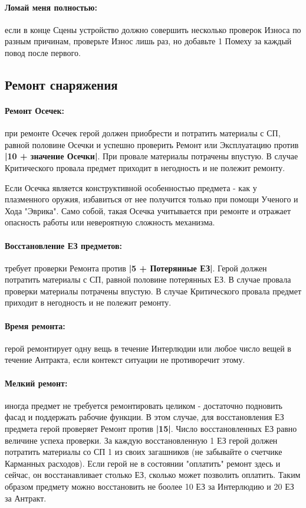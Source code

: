 \paragraph{Ломай меня полностью:} если в конце Сцены устройство должно совершить несколько проверок Износа по разным причинам, проверьте Износ лишь раз, но добавьте 1 Помеху за каждый повод после первого. 

\subsection{Ремонт снаряжения}
\paragraph{Ремонт Осечек:} при ремонте Осечек герой должен приобрести и потратить материалы с СП, равной половине Осечки и успешно проверить Ремонт или Эксплуатацию против \textbf{|10 + значение Осечки|}. При провале материалы потрачены впустую. В случае Критического провала предмет приходит в негодность и  не полежит ремонту. 
\begin{tcolorbox}
    Если Осечка является конструктивной особенностью предмета - как у плазменного оружия, избавиться от нее получится только при помощи Ученого и Хода "Эврика". Само собой, такая Осечка учитывается при ремонте и отражает опасность работы или невероятную сложность механизма.
\end{tcolorbox}

\paragraph{Восстановление ЕЗ предметов:} требует проверки Ремонта против \textbf{|5 + Потерянные ЕЗ|}. Герой должен потратить материалы с СП, равной половине потерянных ЕЗ. В случае провала проверки материалы потрачены впустую. В случае Критического провала предмет приходит в негодность и не полежит ремонту.
\paragraph{Время ремонта:} герой ремонтирует одну вещь в течение Интерлюдии или любое число вещей в течение Антракта, если контекст ситуации не противоречит этому. 

\paragraph{Мелкий ремонт:} иногда предмет не требуется ремонтировать целиком - достаточно подновить фасад и поддержать рабочие функции. В этом случае, для восстановления ЕЗ предмета герой проверяет Ремонт против \textbf{|15|}. Число восстановленных ЕЗ равно величине успеха проверки. За каждую восстановленную 1 ЕЗ герой должен потратить материалы со СП 1 из своих загашников (не забывайте о счетчике Карманных расходов). Если герой не в состоянии "оплатить" ремонт здесь и сейчас, он восстанавливает столько ЕЗ, сколько может позволить оплатить. Таким образом предмету можно восстановить не боолее 10 ЕЗ за Интерлюдию и 20 ЕЗ за Антракт.
